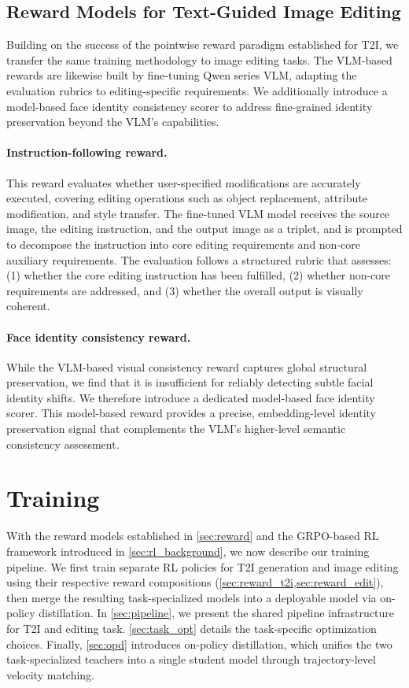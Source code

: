 \documentclass{llmxive}
\begin{document}
\subsection{Reward Models for Text-Guided Image Editing}
\label{sec:reward_edit}

Building on the success of the pointwise reward paradigm established for T2I, we transfer the same training methodology to image editing tasks. The VLM-based rewards are likewise built by fine-tuning Qwen series VLM, adapting the evaluation rubrics to editing-specific requirements. We additionally introduce a model-based face identity consistency scorer to address fine-grained identity preservation beyond the VLM's capabilities.

\paragraph{Instruction-following reward.} This reward evaluates whether user-specified modifications are accurately executed, covering editing operations such as object replacement, attribute modification, and style transfer. The fine-tuned VLM model receives the source image, the editing instruction, and the output image as a triplet, and is prompted to decompose the instruction into core editing requirements and non-core auxiliary requirements. The evaluation follows a structured rubric that assesses: (1) whether the core editing instruction has been fulfilled, (2) whether non-core requirements are addressed, and (3) whether the overall output is visually coherent.


\paragraph{Face identity consistency reward.} While the VLM-based visual consistency reward captures global structural preservation, we find that it is insufficient for reliably detecting subtle facial identity shifts. We therefore introduce a dedicated model-based face identity scorer. This model-based reward provides a precise, embedding-level identity preservation signal that complements the VLM's higher-level semantic consistency assessment.



\section{Training}
\label{sec:training}

With the reward models established in \cref{sec:reward} and the GRPO-based RL framework introduced in \cref{sec:rl_background}, we now describe our training pipeline. We first train separate RL policies for T2I generation and image editing using their respective reward compositions (\cref{sec:reward_t2i,sec:reward_edit}), then merge the resulting task-specialized models into a deployable model via on-policy distillation. In \cref{sec:pipeline}, we present the shared pipeline infrastructure for T2I and editing task. \cref{sec:task_opt} details the task-specific optimization choices. Finally, \cref{sec:opd} introduces on-policy distillation, which unifies the two task-specialized teachers into a single student model through trajectory-level velocity matching.
\end{document}
